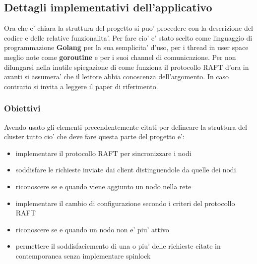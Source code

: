 \subsection{Dettagli implementativi dell'applicativo}

Ora che e' chiara la struttura del progetto si puo' procedere con la descrizione del
codice e delle relative funzionalita'. Per fare cio' e' stato scelto come linguaggio
di programmazione \textbf{Golang} per la sua semplicita' d'uso, per i thread in user space
meglio note come \textbf{goroutine} e per i suoi channel di comunicazione.
Per non dilungarsi nella inutile spiegazione di come funziona il protocollo RAFT d'ora in avanti
si assumera' che il lettore abbia conoscenza dell'argomento. In caso contrario si invita
a leggere il paper di riferimento.
\subsubsection{Obiettivi}
Avendo usato gli elementi precendentemente citati per delineare la struttura del cluster tutto
cio' che deve fare questa parte del progetto e':
\begin{itemize}
    \item implementare il protocollo RAFT per sincronizzare i nodi
    \item soddisfare le richieste inviate dai client distinguendole da quelle dei nodi
    \item riconoscere se e quando viene aggiunto un nodo nella rete
    \item implementare il cambio di configurazione secondo i criteri del protocollo RAFT
    \item riconoscere se e quando un nodo non e' piu' attivo
    \item permettere il soddisfaciemento di una o piu' delle richieste citate in contemporanea 
        senza implementare spinlock
\end{itemize}

